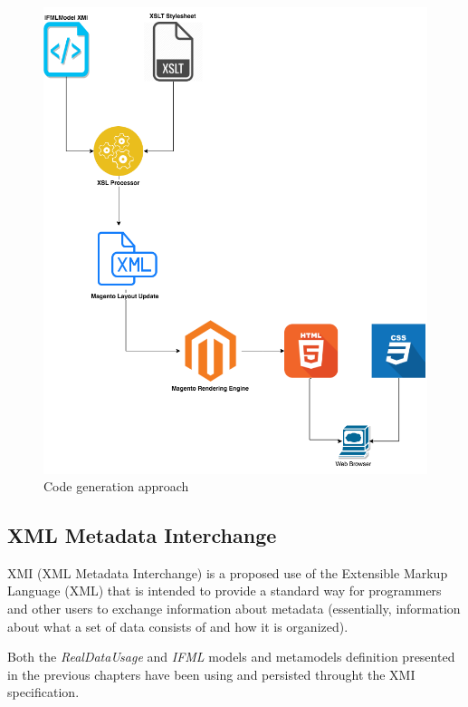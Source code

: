 \vspace{0.5cm}
\begin{figure}[H]
  \centering
    \includegraphics[width=14cm]{images/code-generation.png}
  \caption{Code generation approach}
  \label{fig:code-generation}
\end{figure}
\vspace{0.5cm}

\subsection{XML Metadata Interchange}

XMI (XML Metadata Interchange) is a proposed use of the Extensible Markup Language (XML) that is intended to provide a standard way for programmers and other users to exchange information about metadata (essentially, information about what a set of data consists of and how it is organized)\cite{xmi}. 

Both the \textit{RealDataUsage} and \textit{IFML} models and metamodels definition presented in the previous chapters have been using and persisted throught the XMI specification.

